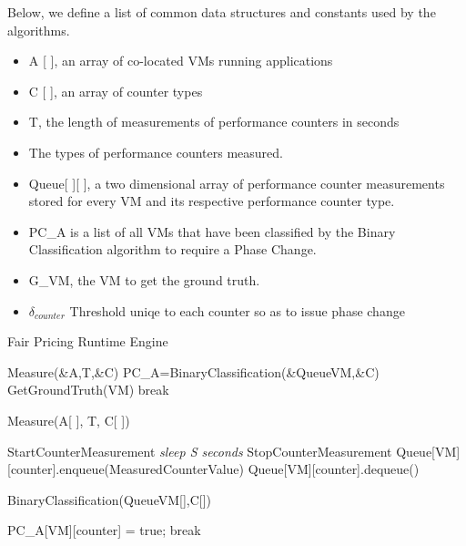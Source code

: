 \documentclass[pageno]{jpaper}
\begin{document}
Below, we define a list of common data structures and constants used by the algorithms.
\begin{itemize}
  \item A [ ], an array of co-located VMs running applications
  \item C [ ], an array of counter types 
  \item T, the length of measurements of performance counters in seconds
  \item The types of performance counters measured.
  \item Queue[ ][ ], a two dimensional array of performance counter measurements stored for every VM and its respective performance counter type.
  \item PC\_A is a list of all VMs that have been classified by the Binary Classification algorithm to require a Phase Change.
  \item G\_VM, the VM to get the ground truth.
  \item $ \delta_{counter} $ Threshold uniqe to each counter so as to issue phase change
\end{itemize}
\begin{algorithm}
\caption{Fair Pricing Runtime Engine}
\begin{algorithmic}[1]
\label{FPRE}
\State Measure(\&A,T,\&C)\;
\State PC\_A=BinaryClassification(\&QueueVM,\&C)\;
	GetGroundTruth(VM)\;
	break\;
	\EndIf
\EndFor
\EndFor

\EndWhile
\end{algorithmic}
\end{algorithm}
\begin{algorithm}
\caption{Measure(A[ ], T, C[ ])}
\begin{algorithmic}[1]
\State StartCounterMeasurement \;
\EndFor
\EndFor
\textit{sleep S seconds}\;
\State	StopCounterMeasurement \;
\State	Queue[VM][counter].enqueue(MeasuredCounterValue)\;
\State	Queue[VM][counter].dequeue()\;
\EndFor
\EndFor
\end{algorithmic}
\end{algorithm}
\begin{algorithm}
\caption{BinaryClassification(QueueVM[],C[])}
\begin{algorithmic}[1]
\label{BC}
	PC\_A[VM][counter] = true;
	break\;
	\EndIf
\EndFor
\EndFor
\end{algorithmic}
\end{algorithm}
\end{document}

